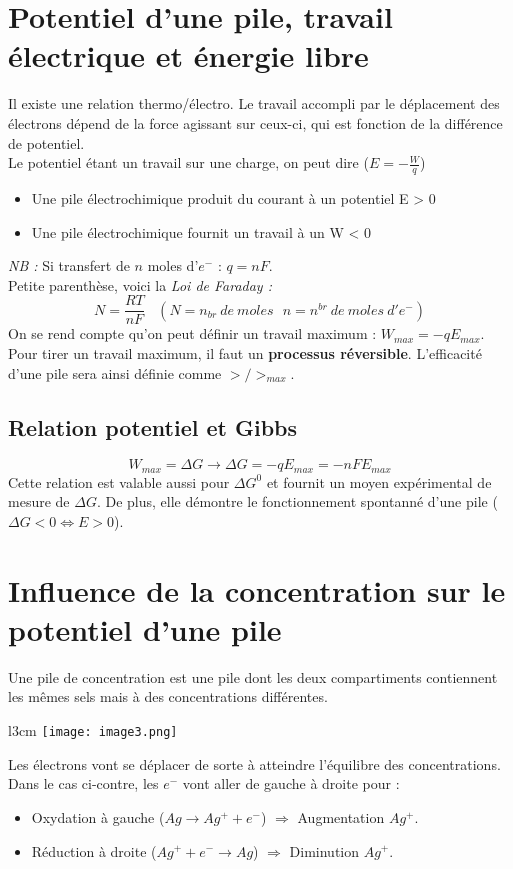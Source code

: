 \documentclass[british,french,11pt, a4paper, openany]{book}
\begin{document}
\section{Potentiel d'une pile, travail électrique et énergie libre}
Il existe une relation thermo/électro. Le travail accompli par le déplacement des électrons dépend de la force agissant sur ceux-ci, qui est fonction de la différence de potentiel.\\
Le potentiel étant un travail sur une charge, on peut dire ($E = -\frac{W}{q}$)
\begin{itemize}
	\item Une pile électrochimique produit du courant à un potentiel E > 0
	\item Une pile électrochimique fournit un travail à un W < 0
\end{itemize}
\textit{NB :} Si transfert de $n$ moles d'$e^-$ : $q = nF$.\\

Petite parenthèse, voici la \textit{Loi de Faraday :}
$$N = \frac{RT}{nF}\ \ \ \ (N = n_{br}\ de\ moles\ \ \ n = n^{br}\ de\ moles\ d'e^-)$$
On se rend compte qu'on peut définir un travail maximum : $W_{max} = -qE_{max}$. Pour tirer un travail maximum, il faut un \textbf{processus réversible}. L'efficacité d'une pile sera ainsi définie comme $>/>_{max}$.
\subsection*{Relation potentiel et Gibbs}
$$W_{max} = \Delta G \rightarrow \Delta G = -qE_{max} = -nFE_{max}$$
Cette relation est valable aussi pour $\Delta G^0$ et fournit un moyen expérimental de mesure de $\Delta G$. De plus, elle démontre le fonctionnement spontanné d'une pile ($\Delta G <0 \Leftrightarrow E > 0$).

\section{Influence de la concentration sur le potentiel d'une pile}
Une pile de concentration est une pile dont les deux compartiments contiennent les mêmes sels mais à des concentrations différentes. 
\begin{wrapfigure}[6]{l}{3cm}
	\texttt{[image: image3.png]}
\end{wrapfigure}

Les électrons vont se déplacer de sorte à atteindre l'équilibre des concentrations. Dans le cas ci-contre, les $e^-$ vont aller de gauche à droite pour :
\begin{itemize}
	\item Oxydation à gauche ($Ag \rightarrow Ag^+ + e^-$) $\Rightarrow$ Augmentation $Ag^+$.
	\item Réduction à droite ($Ag^+ +e^- \rightarrow Ag$) $\Rightarrow$ Diminution $Ag^+$.
\end{itemize}
\end{document}
